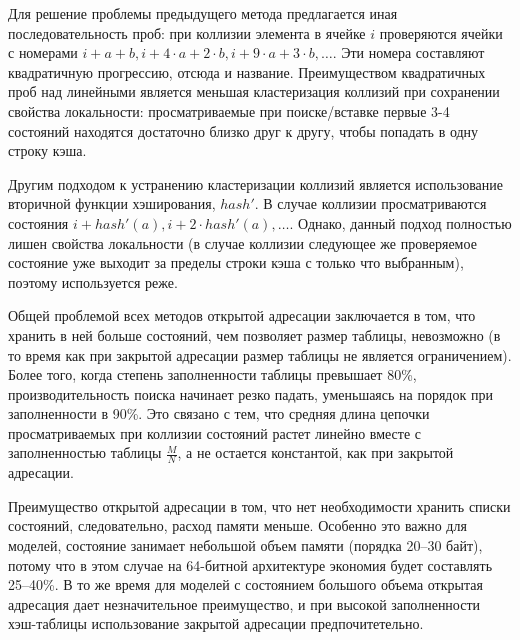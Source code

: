 
Для решение проблемы предыдущего метода предлагается иная последовательность проб: при
коллизии элемента в ячейке $i$ проверяются ячейки с номерами $i + a + b, i + 4 \cdot a + 2
\cdot b, i + 9 \cdot a + 3\cdot b, \ldots$. Эти номера составляют квадратичную прогрессию,
отсюда и название. Преимуществом квадратичных проб над линейными является меньшая
кластеризация коллизий при сохранении свойства локальности: просматриваемые при
поиске/вставке первые 3-4 состояний находятся достаточно близко друг к другу, чтобы
попадать в одну строку кэша.


Другим подходом к устранению кластеризации коллизий является использование вторичной
функции хэширования, $hash'$. В случае коллизии просматриваются состояния $i + hash'(a), i
+ 2\cdot hash'(a), \ldots$. Однако, данный подход полностью лишен свойства локальности (в
случае коллизии следующее же проверяемое состояние уже выходит за пределы строки кэша с
только что выбранным), поэтому используется реже.

Общей проблемой всех методов открытой адресации заключается в том, что хранить в ней
больше состояний, чем позволяет размер таблицы, невозможно (в то время как при закрытой
адресации размер таблицы не является ограничением). Более того, когда степень
заполненности таблицы превышает 80\%, производительность поиска начинает резко падать,
уменьшаясь на порядок при заполненности в 90\%. Это связано с тем, что средняя длина
цепочки просматриваемых при коллизии состояний растет линейно вместе с заполненностью
таблицы $\frac{M}{N}$, а не остается константой, как при закрытой адресации.

Преимущество открытой адресации в том, что нет необходимости хранить списки состояний,
следовательно, расход памяти меньше. Особенно это важно для моделей, состояние занимает
небольшой объем памяти (порядка 20--30 байт), потому что в этом случае на 64-битной
архитектуре экономия будет составлять 25--40\%. В то же время для моделей с состоянием
большого объема открытая адресация дает незначительное преимущество, и при высокой
заполненности хэш-таблицы использование закрытой адресации предпочитетельно.

